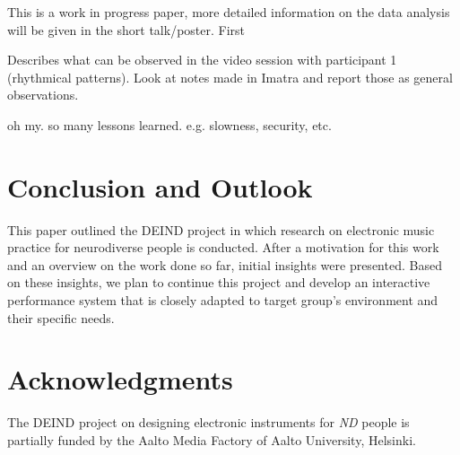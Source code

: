 \documentclass{chi-ext}
\begin{document}
\begin{multicols}{2}
This is a work in progress paper, more detailed information on the data analysis will be given in the short talk/poster.
First 

Describes what can be observed in the video session with participant 1 (rhythmical patterns).
Look at notes made in Imatra and report those as general observations.


oh my. so many lessons learned.
e.g. slowness, security, etc.



\section{Conclusion and Outlook}
\label{sec:outlook}

This paper outlined the DEIND project in which research on electronic music practice for neurodiverse people is conducted.
After a motivation for this work and an overview on the work done so far, initial insights were presented.
Based on these insights, we plan to continue this project and develop an interactive performance system that is closely adapted to target group's environment and their specific needs.

\section{Acknowledgments}
The DEIND project on designing electronic instruments for \emph{ND} people is partially funded by the Aalto Media Factory of Aalto University, Helsinki.  


~\nocite{cappelen2012-mus,herstad2012-wha,herstad2012-mak,green2011agility,kleimola2011-vec,kleimola2010-fee,parker2011-a-s,parker2010-mod,valimaki2010-par,straus2011-ext,hegarty2006-noi,gurevich2007expression,burrows2010choreographer,bown2009understanding,jaarsma2012autism,hammel2011teaching,fard2012-wit,baggs2007-in,sinclair1993-don,wishart1994-aud,headlam2006-lea,2006-sou,campo2009-microsound,campo2009-the,m.-baalman2009-the,campo2008-objMod,wcd2011-scbook}



 

\end{multicols}
\end{document}
